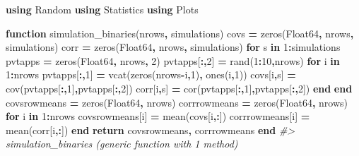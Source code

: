 \documentclass[
]{article}
\newenvironment{Shaded}{\begin{snugshade}}{\end{snugshade}}
\newcommand{\BuiltInTok}[1]{#1}
\newcommand{\CommentTok}[1]{\textcolor[rgb]{0.56,0.35,0.01}{\textit{#1}}}
\newcommand{\DataTypeTok}[1]{\textcolor[rgb]{0.13,0.29,0.53}{#1}}
\newcommand{\FloatTok}[1]{\textcolor[rgb]{0.00,0.00,0.81}{#1}}
\newcommand{\KeywordTok}[1]{\textcolor[rgb]{0.13,0.29,0.53}{\textbf{#1}}}
\newcommand{\NormalTok}[1]{#1}
\newcommand{\OperatorTok}[1]{\textcolor[rgb]{0.81,0.36,0.00}{\textbf{#1}}}
\begin{document}
\begin{Shaded}
\begin{Highlighting}[]
\KeywordTok{using} \BuiltInTok{Random}
\KeywordTok{using}\NormalTok{ Statistics}
\KeywordTok{using}\NormalTok{ Plots}

\KeywordTok{function}\NormalTok{ simulation\_binaries(nrows}\OperatorTok{,}\NormalTok{ simulations) }
\NormalTok{    covs }\OperatorTok{=}\NormalTok{ zeros(}\DataTypeTok{Float64}\OperatorTok{,}\NormalTok{ nrows}\OperatorTok{,}\NormalTok{ simulations)}
\NormalTok{    corr }\OperatorTok{=}\NormalTok{ zeros(}\DataTypeTok{Float64}\OperatorTok{,}\NormalTok{ nrows}\OperatorTok{,}\NormalTok{ simulations)}
    \KeywordTok{for}\NormalTok{ s }\KeywordTok{in} \FloatTok{1}\OperatorTok{:}\NormalTok{simulations}
\NormalTok{        pvtapps }\OperatorTok{=}\NormalTok{ zeros(}\DataTypeTok{Float64}\OperatorTok{,}\NormalTok{ nrows}\OperatorTok{,} \FloatTok{2}\NormalTok{)}
\NormalTok{        pvtapps[}\OperatorTok{:,}\FloatTok{2}\NormalTok{] }\OperatorTok{=}\NormalTok{ rand(}\FloatTok{1}\OperatorTok{:}\FloatTok{10}\OperatorTok{,}\NormalTok{nrows)}
        \KeywordTok{for}\NormalTok{ i }\KeywordTok{in} \FloatTok{1}\OperatorTok{:}\NormalTok{nrows}
\NormalTok{            pvtapps[}\OperatorTok{:,}\FloatTok{1}\NormalTok{] }\OperatorTok{=}\NormalTok{ vcat(zeros(nrows}\OperatorTok{{-}}\NormalTok{i}\OperatorTok{,}\FloatTok{1}\NormalTok{)}\OperatorTok{,}\NormalTok{ ones(i}\OperatorTok{,}\FloatTok{1}\NormalTok{))}
\NormalTok{            covs[i}\OperatorTok{,}\NormalTok{s] }\OperatorTok{=}\NormalTok{ cov(pvtapps[}\OperatorTok{:,}\FloatTok{1}\NormalTok{]}\OperatorTok{,}\NormalTok{pvtapps[}\OperatorTok{:,}\FloatTok{2}\NormalTok{])}
\NormalTok{            corr[i}\OperatorTok{,}\NormalTok{s] }\OperatorTok{=}\NormalTok{ cor(pvtapps[}\OperatorTok{:,}\FloatTok{1}\NormalTok{]}\OperatorTok{,}\NormalTok{pvtapps[}\OperatorTok{:,}\FloatTok{2}\NormalTok{])}
        \KeywordTok{end}
    \KeywordTok{end}
\NormalTok{    covsrowmeans }\OperatorTok{=}\NormalTok{ zeros(}\DataTypeTok{Float64}\OperatorTok{,}\NormalTok{ nrows)}
\NormalTok{    corrrowmeans }\OperatorTok{=}\NormalTok{ zeros(}\DataTypeTok{Float64}\OperatorTok{,}\NormalTok{ nrows)}
    \KeywordTok{for}\NormalTok{ i }\KeywordTok{in} \FloatTok{1}\OperatorTok{:}\NormalTok{nrows}
\NormalTok{        covsrowmeans[i] }\OperatorTok{=}\NormalTok{ mean(covs[i}\OperatorTok{,:}\NormalTok{])}
\NormalTok{        corrrowmeans[i] }\OperatorTok{=}\NormalTok{ mean(corr[i}\OperatorTok{,:}\NormalTok{])}
    \KeywordTok{end}
    \KeywordTok{return}\NormalTok{ covsrowmeans}\OperatorTok{,}\NormalTok{ corrrowmeans}
\KeywordTok{end}
\CommentTok{\#\textgreater{} simulation\_binaries (generic function with 1 method)}


\end{Highlighting}
\end{Shaded}
\end{document}
